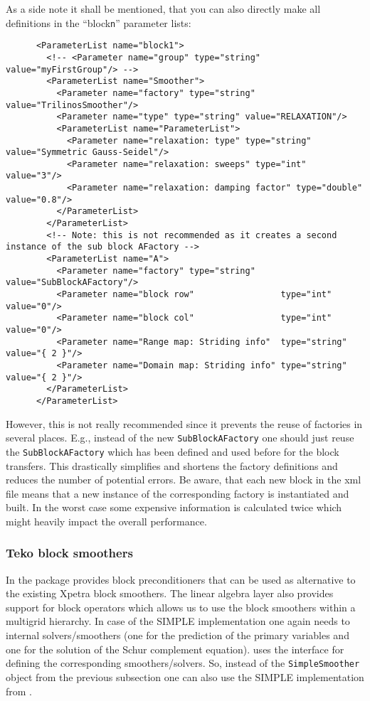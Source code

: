 \documentclass[10pt,fleqn]{book}
\begin{document}
As a side note it shall be mentioned, that you can also directly make all definitions in the ``block\texttt{n}'' parameter lists:
\begin{lstlisting}
      <ParameterList name="block1">
        <!-- <Parameter name="group" type="string" value="myFirstGroup"/> -->
        <ParameterList name="Smoother">
          <Parameter name="factory" type="string" value="TrilinosSmoother"/>
          <Parameter name="type" type="string" value="RELAXATION"/>
          <ParameterList name="ParameterList">
            <Parameter name="relaxation: type" type="string" value="Symmetric Gauss-Seidel"/>
            <Parameter name="relaxation: sweeps" type="int"    value="3"/>
            <Parameter name="relaxation: damping factor" type="double" value="0.8"/>
          </ParameterList>         
        </ParameterList>
        <!-- Note: this is not recommended as it creates a second instance of the sub block AFactory -->        
        <ParameterList name="A">
          <Parameter name="factory" type="string" value="SubBlockAFactory"/>
          <Parameter name="block row"                 type="int"     value="0"/>
          <Parameter name="block col"                 type="int"     value="0"/>
          <Parameter name="Range map: Striding info"  type="string"  value="{ 2 }"/>
          <Parameter name="Domain map: Striding info" type="string"  value="{ 2 }"/>
        </ParameterList>        
      </ParameterList>
\end{lstlisting}
However, this is not really recommended since it prevents the reuse of factories in several places. E.g., instead of the new  \texttt{SubBlockAFactory} one should just reuse the \texttt{SubBlockAFactory} which has been defined and used before for the block transfers. This drastically simplifies and shortens the factory definitions and reduces the number of potential errors. Be aware, that each new block in the xml file means that a new instance of the corresponding factory is instantiated and built. In the worst case some expensive information is calculated twice which might heavily impact the overall performance.

\subsubsection{Teko block smoothers}

In \trilinos the \teko package provides block preconditioners that can be used as alternative to the existing Xpetra block smoothers. The \xpetra linear algebra layer also provides support for \thyra block operators which allows us to use the \teko block smoothers within a \muelu multigrid hierarchy. In case of the \teko SIMPLE implementation one again needs to internal solvers/smoothers (one for the prediction of the primary variables and one for the solution of the Schur complement equation). \teko uses the \stratimikos interface for defining the corresponding smoothers/solvers. So, instead of the \texttt{SimpleSmoother} object from the previous subsection one can also use the SIMPLE implementation from \teko.
\end{document}
